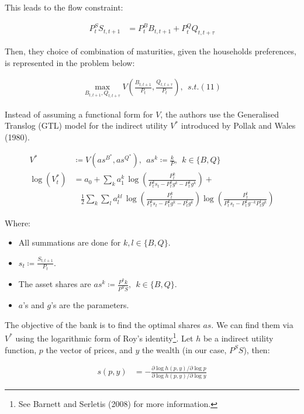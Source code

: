 \documentclass[12pt]{article}
\begin{document}
This leads to the flow constraint:

\begin{align*}
    P^S_tS_{t,t+1} &= P^B_tB_{t,t+1} + P^Q_tQ_{t,t+\tau} \tag{11}
\end{align*}

Then, they choice of combination of maturities, given the households preferences, is represented in the problem below:

\begin{align*}
    \max_{B_{t,t+1},Q_{t,t+\tau}}V\left({\frac{B_{t,t+1}}{P_{t}}},{\frac{Q_{t,t+\tau}}{P_{t}}}\right), ~~ s.t. (11)
\end{align*}

Instead of assuming a functional form for $V$, the authors use the Generalised Translog (GTL) model for the indirect utility $V^*$ introduced by Pollak and Wales (1980). %

\begin{align*}
    V^* &\coloneqq V\left(as^{B^*}, as^{Q^*}\right), ~~ as^{k} \coloneqq \frac{k}{P}, ~~ k \in \{B,Q\}\\
    \log(V_{t}^{*}) &= a_{0}+\sum_{k}a_{1}^{k}\,\log\left({\frac{P_{t}^{k}}{P_{t}^{k}s_{t}-P_{t}^{k}g^{k}-P_{t}^{k}g^{k}}}\right)+\\
    &~~~~{\frac{1}{2}}\sum_{k}\sum_{l}a_{l}^{k l}\,\log\left({\frac{P_{t}^{k}}{P_{t}^{k}s_{t}-P_{t}^{k}g^{k}-P_{t}^{l}g^{k}}}\right)\log\left({\frac{P_{t}^{l}}{P_{t}^{k}s_{t}-P_{t}^{k}g^{-k}P_{t}^{l}g^{k}}}\right)
\end{align*}

Where:

\begin{itemize}
    \item All summations are done for $k,l \in \{B,Q\}$.
    \item $s_t \coloneqq \frac{S_{t,t+1}}{P_t}$.
    \item The asset shares are $as^{k} \coloneqq \frac{P^kk}{P^SS}, ~~ k \in \{B,Q\}$.
    \item $a$'s and $g$'s are the parameters.
\end{itemize}

The objective of the bank is to find the optimal shares $as$. We can find them via $V^*$ using the logarithmic form of Roy's identity\footnote{See Barnett and Serletis (2008) for more information.}. Let $h$ be a indirect utility function, $p$ the vector of prices, and $y$ the wealth (in our case, $P^SS$), then:%

\begin{align*}
    s(p,y) &= -\frac{\partial\log h(p,y)/\partial\log p}{\partial\log h(p,y)/\partial\log y}
\end{align*}
\end{document}

